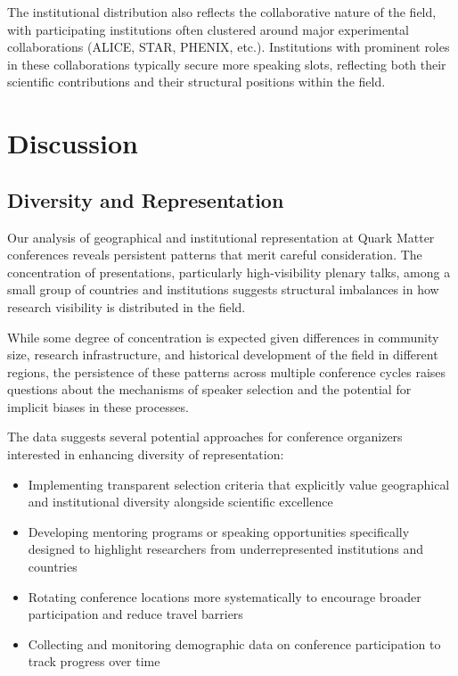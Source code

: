 \documentclass[a4paper,11pt]{article}
\begin{document}
The institutional distribution also reflects the collaborative nature of the field, with participating institutions often clustered around major experimental collaborations (ALICE, STAR, PHENIX, etc.). Institutions with prominent roles in these collaborations typically secure more speaking slots, reflecting both their scientific contributions and their structural positions within the field.

\section{Discussion}

\subsection{Diversity and Representation}

Our analysis of geographical and institutional representation at Quark Matter conferences reveals persistent patterns that merit careful consideration. The concentration of presentations, particularly high-visibility plenary talks, among a small group of countries and institutions suggests structural imbalances in how research visibility is distributed in the field.

While some degree of concentration is expected given differences in community size, research infrastructure, and historical development of the field in different regions, the persistence of these patterns across multiple conference cycles raises questions about the mechanisms of speaker selection and the potential for implicit biases in these processes.

The data suggests several potential approaches for conference organizers interested in enhancing diversity of representation:

\begin{itemize}
    \item Implementing transparent selection criteria that explicitly value geographical and institutional diversity alongside scientific excellence
    \item Developing mentoring programs or speaking opportunities specifically designed to highlight researchers from underrepresented institutions and countries
    \item Rotating conference locations more systematically to encourage broader participation and reduce travel barriers
    \item Collecting and monitoring demographic data on conference participation to track progress over time
\end{itemize}
\end{document}
